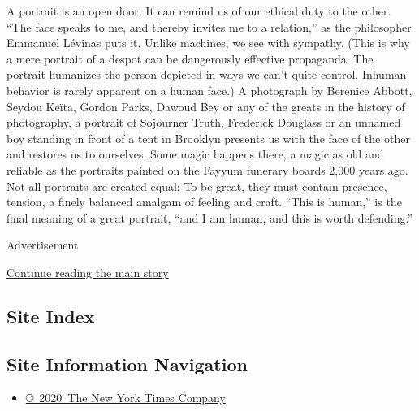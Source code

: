 A portrait is an open door. It can remind us of our ethical duty to the
other. ``The face speaks to me, and thereby invites me to a relation,''
as the philosopher Emmanuel Lévinas puts it. Unlike machines, we see
with sympathy. (This is why a mere portrait of a despot can be
dangerously effective propaganda. The portrait humanizes the person
depicted in ways we can't quite control. Inhuman behavior is rarely
apparent on a human face.) A photograph by Berenice Abbott, Seydou
Keïta, Gordon Parks, Dawoud Bey or any of the greats in the history of
photography, a portrait of Sojourner Truth, Frederick Douglass or an
unnamed boy standing in front of a tent in Brooklyn presents us with the
face of the other and restores us to ourselves. Some magic happens
there, a magic as old and reliable as the portraits painted on the
Fayyum funerary boards 2,000 years ago. Not all portraits are created
equal: To be great, they must contain presence, tension, a finely
balanced amalgam of feeling and craft. ``This is human,'' is the final
meaning of a great portrait, ``and I am human, and this is worth
defending.''

Advertisement

\protect\hyperlink{after-bottom}{Continue reading the main story}

\hypertarget{site-index}{%
\subsection{Site Index}\label{site-index}}

\hypertarget{site-information-navigation}{%
\subsection{Site Information
Navigation}\label{site-information-navigation}}

\begin{itemize}
\tightlist
\item
  \href{https://help.nytimes3xbfgragh.onion/hc/en-us/articles/115014792127-Copyright-notice}{©~2020~The
  New York Times Company}
\end{itemize}

